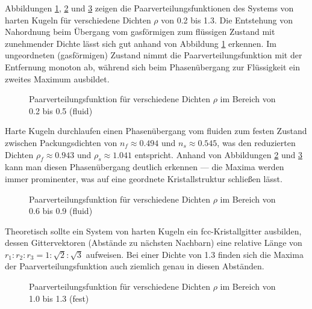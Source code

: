 Abbildungen \ref{fig:paarverteilung1}, \ref{fig:paarverteilung2} und \ref{fig:paarverteilung3} zeigen die Paarverteilungsfunktionen des Systems von harten Kugeln für verschiedene Dichten $\rho$ von 0.2 bis 1.3. Die Entstehung von Nahordnung beim Übergang vom gasförmigen zum flüssigen Zustand mit zunehmender Dichte lässt sich gut anhand von Abbildung \ref{fig:paarverteilung1} erkennen. Im ungeordneten (gasförmigen) Zustand nimmt die Paarverteilungsfunktion mit der Entfernung monoton ab, während sich beim Phasenübergang zur Flüssigkeit ein zweites Maximum ausbildet. 

\begin{figure}[H]
 \centering
 \resizebox{0.9\textwidth}{!}{}
 \caption{Paarverteilungsfunktion für verschiedene Dichten $\rho$ im Bereich von 0.2 bis 0.5 (fluid)}
 \label{fig:paarverteilung1}
\end{figure} 

Harte Kugeln durchlaufen einen Phasenübergang vom fluiden zum festen Zustand zwischen Packungsdichten von $n_f \approx 0.494$ und $n_s \approx 0.545$, was den reduzierten Dichten $\rho_f \approx 0.943$ und $\rho_s \approx 1.041$ entspricht. Anhand von Abbildungen \ref{fig:paarverteilung2} und \ref{fig:paarverteilung3} kann man diesen Phasenübergang deutlich erkennen --- die Maxima werden immer prominenter, was auf eine geordnete Kristallstruktur schließen lässt. 
 
\begin{figure}[H]
 \centering
 \resizebox{0.9\textwidth}{!}{}
  \caption{Paarverteilungsfunktion für verschiedene Dichten $\rho$ im Bereich von 0.6 bis 0.9 (fluid) }
 \label{fig:paarverteilung2}
\end{figure} 
 
Theoretisch sollte ein System von harten Kugeln ein fcc-Kristallgitter ausbilden, dessen Gittervektoren  (Abstände zu nächsten Nachbarn)  eine relative Länge von $r_1 : r_2 : r_3 = 1 : \sqrt{2} : \sqrt{3}$ aufweisen. Bei einer Dichte von 1.3 finden sich die Maxima der Paarverteilungsfunktion auch ziemlich genau in diesen Abständen. 
 

\begin{figure}[H]
 \centering
  \resizebox{0.9\textwidth}{!}{}
 \caption{Paarverteilungsfunktion für verschiedene Dichten $\rho$ im Bereich von 1.0 bis 1.3 (fest) }
 \label{fig:paarverteilung3}
\end{figure} 

